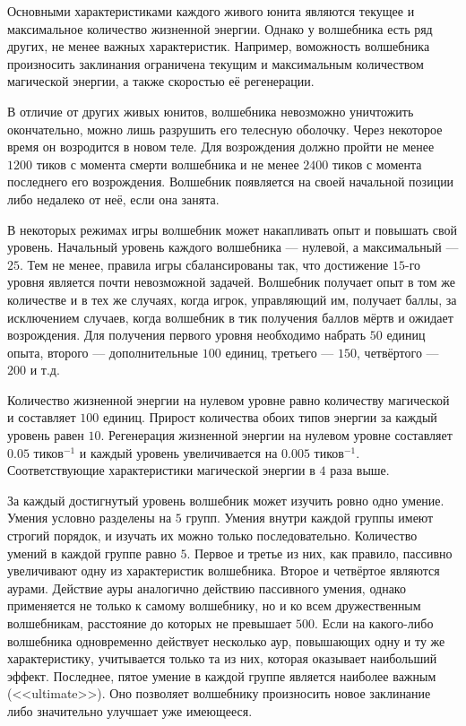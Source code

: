 Основными характеристиками каждого живого юнита являются текущее и максимальное количество жизненной энергии. Однако у волшебника есть ряд
других, не менее важных характеристик. Например, воможность волшебника произносить заклинания ограничена текущим и максимальным количеством
магической энергии, а также скоростью её регенерации.

В отличие от других живых юнитов, волшебника невозможно уничтожить окончательно, можно лишь разрушить его телесную оболочку. Через некоторое
время он возродится в новом теле. Для возрождения должно пройти не менее $1200$ тиков с момента смерти волшебника и не менее $2400$ тиков с
момента последнего его возрождения. Волшебник появляется на своей начальной позиции либо недалеко от неё, если она занята.

В некоторых режимах игры волшебник может накапливать опыт и повышать свой уровень. Начальный уровень каждого волшебника --- нулевой, а
максимальный --- $25$. Тем не менее, правила игры сбалансированы так, что достижение $15$-го уровня является почти невозможной задачей.
Волшебник получает опыт в том же количестве и в тех же случаях, когда игрок, управляющий им, получает баллы, за исключением случаев, когда
волшебник в тик получения баллов мёртв и ожидает возрождения. Для получения первого уровня необходимо набрать $50$ единиц опыта, второго ---
дополнительные $100$ единиц, третьего --- $150$, четвёртого --- $200$ и т.д.

Количество жизненной энергии на нулевом уровне равно количеству магической и составляет $100$ единиц. Прирост количества обоих типов энергии
за каждый уровень равен $10$. Регенерация жизненной энергии на нулевом уровне составляет $0.05$ тиков$^{-1}$ и каждый уровень увеличивается
на $0.005$ тиков$^{-1}$. Соответствующие характеристики магической энергии в $4$ раза выше.

За каждый достигнутый уровень волшебник может изучить ровно одно умение. Умения условно разделены на $5$ групп. Умения внутри каждой группы
имеют строгий порядок, и изучать их можно только последовательно. Количество умений в каждой группе равно $5$. Первое и третье из них, как
правило, пассивно увеличивают одну из характеристик волшебника. Второе и четвёртое являются аурами. Действие ауры аналогично действию
пассивного умения, однако применяется не только к самому волшебнику, но и ко всем дружественным волшебникам, расстояние до которых не
превышает $500$. Если на какого-либо волшебника одновременно действует несколько аур, повышающих одну и ту же характеристику, учитывается
только та из них, которая оказывает наибольший эффект. Последнее, пятое умение в каждой группе является наиболее важным (<<ultimate>>). Оно
позволяет волшебнику произносить новое заклинание либо значительно улучшает уже имеющееся.

